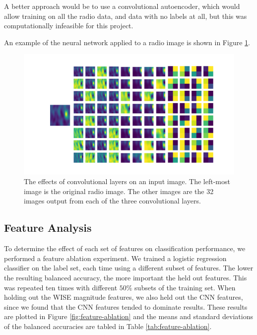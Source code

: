       A better approach would be to use a convolutional autoencoder, which would
      allow training on all the radio data, and data with no labels at all, but
      this was computationally infeasible for this project.

      An example of the neural network applied to a radio image is shown in
      Figure \ref{fig:rgz-cnn}.

      \begin{figure}[!ht]
        \centering
        \includegraphics[width=\textwidth]{images/rgz_cnn}
        \caption{The effects of convolutional layers on an input image. The
          left-most image is the original radio image. The other images are the
          32 images output from each of the three convolutional layers.}
        \label{fig:rgz-cnn}
      \end{figure}

  \subsection{Feature Analysis}
  \label{sec:feature-analysis}

    To determine the effect of each set of features on classification
    performance, we performed a feature ablation experiment. We trained a
    logistic regression classifier on the \citeauthor{norris06} label set, each
    time using a different subset of features. The lower the resulting balanced
    accuracy, the more important the held out features. This was repeated ten
    times with different $50\%$ subsets of the training set. When holding out
    the WISE magnitude features, we also held out the CNN features, since we
    found that the CNN features tended to dominate results. These results are
    plotted in Figure \ref{fig:feature-ablation} and the means and standard
    deviations of the balanced accuracies are tabled in Table
    \ref{tab:feature-ablation}.

